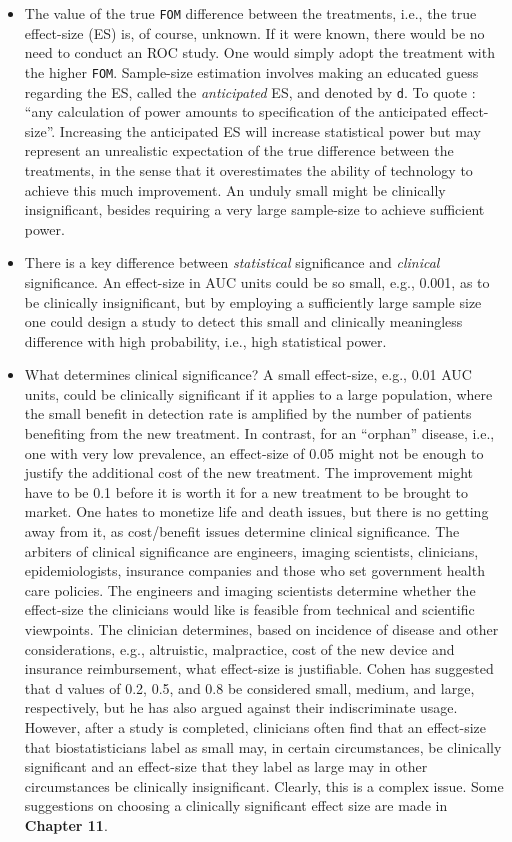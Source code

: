 \documentclass[]{book}
\begin{document}
\begin{itemize}
\item
  The value of the true \texttt{FOM} difference between the treatments, i.e., the true effect-size (ES) is, of course, unknown. If it were known, there would be no need to conduct an ROC study. One would simply adopt the treatment with the higher \texttt{FOM}. Sample-size estimation involves making an educated guess regarding the ES, called the \emph{anticipated} ES, and denoted by \texttt{d}. To quote \citep{RN1983}: ``any calculation of power amounts to specification of the anticipated effect-size''. Increasing the anticipated ES will increase statistical power but may represent an unrealistic expectation of the true difference between the treatments, in the sense that it overestimates the ability of technology to achieve this much improvement. An unduly small might be clinically insignificant, besides requiring a very large sample-size to achieve sufficient power.
\item
  There is a key difference between \emph{statistical} significance and \emph{clinical} significance. An effect-size in AUC units could be so small, e.g., 0.001, as to be clinically insignificant, but by employing a sufficiently large sample size one could design a study to detect this small and clinically meaningless difference with high probability, i.e., high statistical power.
\item
  What determines clinical significance? A small effect-size, e.g., 0.01 AUC units, could be clinically significant if it applies to a large population, where the small benefit in detection rate is amplified by the number of patients benefiting from the new treatment. In contrast, for an ``orphan'' disease, i.e., one with very low prevalence, an effect-size of 0.05 might not be enough to justify the additional cost of the new treatment. The improvement might have to be 0.1 before it is worth it for a new treatment to be brought to market. One hates to monetize life and death issues, but there is no getting away from it, as cost/benefit issues determine clinical significance. The arbiters of clinical significance are engineers, imaging scientists, clinicians, epidemiologists, insurance companies and those who set government health care policies. The engineers and imaging scientists determine whether the effect-size the clinicians would like is feasible from technical and scientific viewpoints. The clinician determines, based on incidence of disease and other considerations, e.g., altruistic, malpractice, cost of the new device and insurance reimbursement, what effect-size is justifiable. Cohen has suggested that d values of 0.2, 0.5, and 0.8 be considered small, medium, and large, respectively, but he has also argued against their indiscriminate usage. However, after a study is completed, clinicians often find that an effect-size that biostatisticians label as small may, in certain circumstances, be clinically significant and an effect-size that they label as large may in other circumstances be clinically insignificant. Clearly, this is a complex issue. Some suggestions on choosing a clinically significant effect size are made in \textbf{Chapter 11}.

\end{itemize}
\end{document}
